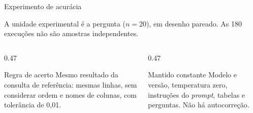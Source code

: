 \documentclass[aspectratio=169,10pt]{beamer}
\begin{document}
\begin{frame}{Experimento de acurácia}
  \centering
  \vspace{2mm}

  \raggedright
  {\small A unidade experimental é a pergunta (\(n = 20\)), em desenho pareado.
  As 180 execuções não são amostras independentes.}
  \vspace{1mm}
  \begin{columns}[T,onlytextwidth]
    \begin{column}{0.47\textwidth}
      \begin{block}{Regra de acerto}
        \small
        Mesmo resultado da consulta de referência: mesmas linhas, sem considerar ordem e nomes de colunas,
        com tolerância de 0,01.
      \end{block}
    \end{column}
    \begin{column}{0.47\textwidth}
      \begin{alertblock}{Mantido constante}
        \small
        Modelo e versão, temperatura zero, instruções do \textit{prompt}, tabelas e perguntas.
        Não há autocorreção.
      \end{alertblock}
    \end{column}
  \end{columns}
\end{frame}
\end{document}

